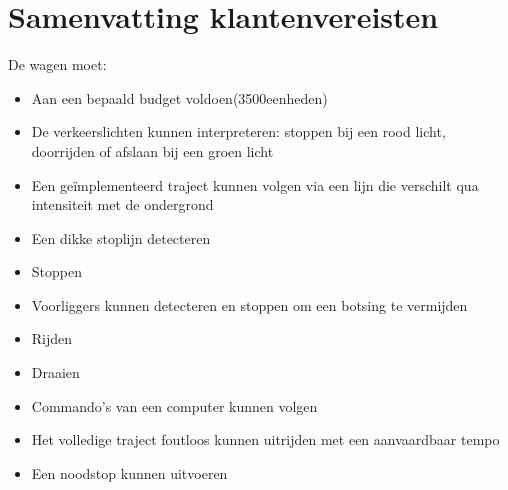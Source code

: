 \documentclass[12pt]{article}
\begin{document}
	

	
	
	\section*{Samenvatting klantenvereisten}
	De wagen moet: 
	\begin{itemize}
		\item Aan een bepaald budget voldoen(3500eenheden)
		
		\item De verkeerslichten kunnen interpreteren: stoppen bij een rood licht, doorrijden of afslaan bij een groen licht
		
		\item Een geïmplementeerd traject kunnen volgen via een lijn die verschilt qua intensiteit met de ondergrond
		
		
		\item Een dikke stoplijn detecteren
		
		\item Stoppen
		
		\item Voorliggers kunnen detecteren en stoppen om een botsing te vermijden
		
		
		\item Rijden
		
		\item Draaien
		

		
		
		\item Commando's van een computer kunnen volgen
		\item Het volledige traject foutloos kunnen uitrijden met een aanvaardbaar tempo
		
		\item Een noodstop kunnen uitvoeren
	\end{itemize}
\end{document}
